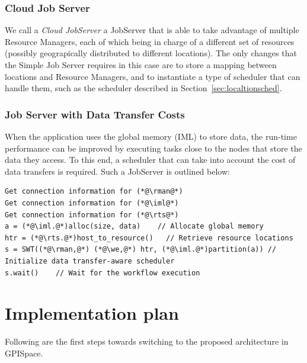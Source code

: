 \documentclass[10pt]{article}
\newcommand{\rts}{RTS\xspace}
\newcommand{\rman}{RM\xspace}
\newcommand{\iml}{IML\xspace}
\newcommand{\we}{WE\xspace}
\begin{document}
\subsubsection{Cloud Job Server}
We call a \emph{Cloud JobServer} a JobServer that is able to take advantage of
multiple Resource Managers, each of which being in charge of a different set of
resources (possibly geograpically distributed to different locations).
The only changes that the Simple Job Server requires in this case are to store a
mapping between locations and Resource Managers, and to instantiate a type of
scheduler that can handle them, such as the scheduler described in
Section~\ref{sec:localtionsched}.

\subsubsection{Job Server with Data Transfer Costs}
When the application uses the global memory (\iml) to store data, the run-time
performance can be improved by executing tasks close to the nodes that store the
data they access. To this end, a scheduler that can take into account the cost
of data transfers is required.
Such a JobServer is outlined below:
\begin{lstlisting}
Get connection information for (*@\rman@*)
Get connection information for (*@\iml@*)
Get connection information for (*@\rts@*)
a = (*@\iml.@*)alloc(size, data)    // Allocate global memory
htr = (*@\rts.@*)host_to_resource()   // Retrieve resource locations 
s = SWT((*@\rman,@*) (*@\we,@*) htr, (*@\iml.@*)partition(a)) // Initialize data transfer-aware scheduler
s.wait()    // Wait for the workflow execution
\end{lstlisting}


\section{Implementation plan}

Following are the first steps towards switching to the proposed architecture in
GPISpace.
\end{document}
